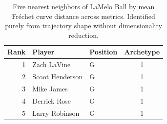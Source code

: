 \begin{table}[htbp]
  \centering\small
  \begin{tabular}{rllc}
    \toprule
    Rank & Player & Position & Archetype \\
    \midrule
    1 & Zach LaVine & G & 1 \\
    2 & Scoot Henderson & G & 1 \\
    3 & Mike James & G & 1 \\
    4 & Derrick Rose & G & 1 \\
    5 & Larry Robinson & G & 1 \\
    \bottomrule
  \end{tabular}
  \caption{Five nearest neighbors of LaMelo Ball by mean Fr\'{e}chet curve distance across metrics. Identified purely from trajectory shape without dimensionality reduction.}
  \label{tab:LaMelo_Ball_frechet_curve_neighbors}
\end{table}

